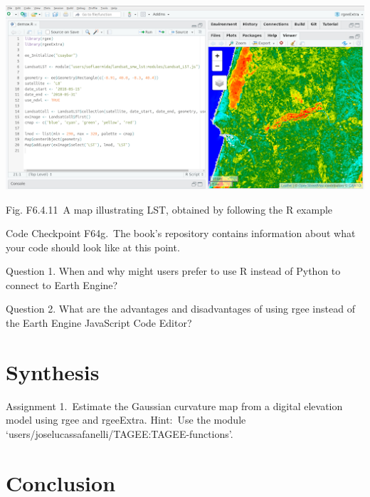 \documentclass[
  letterpaper,
  DIV=11,
  numbers=noendperiod]{scrreprt}
\begin{document}
\includegraphics{./F6/image7.png}

Fig. F6.4.11~A map illustrating LST, obtained by following the R example

\begin{tcolorbox}[enhanced jigsaw, left=2mm, breakable, rightrule=.15mm, opacityback=0, colframe=quarto-callout-note-color-frame, colbacktitle=quarto-callout-note-color!10!white, arc=.35mm, opacitybacktitle=0.6, toptitle=1mm, colback=white, leftrule=.75mm, title=\textcolor{quarto-callout-note-color}{\faInfo}\hspace{0.5em}{Note}, toprule=.15mm, bottomtitle=1mm, titlerule=0mm, bottomrule=.15mm, coltitle=black]

Code Checkpoint F64g.~The book's repository contains information about
what your code should look like at this point.

\end{tcolorbox}

Question 1. When and why might users prefer to use R instead of Python
to connect to Earth Engine?

Question 2. What are the advantages and disadvantages of using rgee
instead of the Earth Engine JavaScript Code Editor?

\hypertarget{synthesis-21}{%
\section*{Synthesis}\label{synthesis-21}}


Assignment 1.~Estimate the Gaussian curvature map from a digital
elevation model using rgee and rgeeExtra. Hint:~Use the module
`users/joselucassafanelli/TAGEE:TAGEE-functions'.

\hypertarget{conclusion-24}{%
\section*{Conclusion}\label{conclusion-24}}
\end{document}
